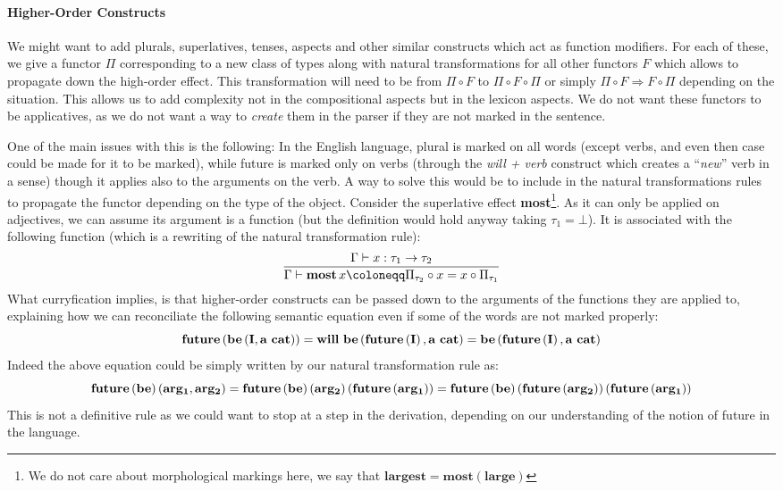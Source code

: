 \documentclass[math, english, info]{cours}
\begin{document}
\paragraph{Higher-Order Constructs}
\label{par:higherorder}
We might want to add plurals, superlatives, tenses, aspects and other similar constructs which act as function modifiers.
For each of these, we give a functor $\Pi$ corresponding to a new class of types along with natural transformations for all other functors $F$ which allows to propagate down the high-order effect.
This transformation will need to be from $\Pi \circ F$ to $\Pi \circ F \circ \Pi$ or simply $\Pi \circ F \Rightarrow F \circ \Pi$ depending on the situation.
This allows us to add complexity not in the compositional aspects but in the lexicon aspects.
We do not want these functors to be applicatives, as we do not want a way to \emph{create} them in the parser if they are not marked in the sentence.

One of the main issues with this is the following:
In the English language, plural is marked on all words (except verbs, and even then case could be made for it to be marked),
while future is marked only on verbs (through the \textit{will + verb} construct which creates a ``\emph{new}'' verb in a sense) though it applies also to the arguments on the verb.
A way to solve this would be to include in the natural transformations rules to propagate the functor depending on the type of the object.
Consider the superlative effect \textbf{most}\footnote{We do not care about morphological markings here, we say that $\mathbf{largest} = \mathbf{most} \left(\mathbf{large}\right)$}.
As it can only be applied on adjectives, we can assume its argument is a function (but the definition would hold anyway taking $\tau_{1} = \bot$).
It is associated with the following function (which is a rewriting of the natural transformation rule):
\begin{equation*}
	\frac{\cont x: \tau_{1} \to \tau_{2}}{\cont \mathbf{most}\, x \coloneqq \Pi_{\tau_{2}} \circ x = x \circ \Pi_{\tau_{1}}}
\end{equation*}
What curryfication implies, is that higher-order constructs can be passed down to the arguments of the functions they are applied to, explaining how we can reconciliate the following semantic equation even if some of the words are not marked properly:
\begin{equation*}
	\bf future\left(be\left( I, a\ cat \right)\right) = will\ be\left( future\left( I \right), a\ cat \right) = be\left( future\left( I \right), a\ cat \right)
\end{equation*}
Indeed the above equation could be simply written by our natural transformation rule as:
\begin{equation*}
	\bf future\left( be \right)\left( arg_{1}, arg_{2} \right) = future\left( be \right)\left( arg_{2} \right)\left( future\left( arg_{1} \right) \right) = future \left( be \right) \left( future \left( arg_{2} \right) \right) \left( future \left( arg_{1} \right) \right)
\end{equation*}
This is not a definitive rule as we could want to stop at a step in the derivation, depending on our understanding of the notion of future in the language.
\end{document}
